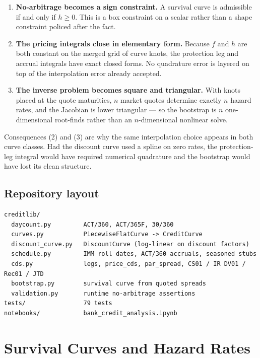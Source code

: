 \documentclass[11pt,a4paper]{article}
\newcommand{\keypoint}[1]{%
  \par\vspace{0.4em}\noindent
  \colorbox{codebg}{\parbox{\dimexpr\linewidth-2\fboxsep}{\small #1}}%
  \par\vspace{0.5em}}
\begin{document}
\begin{enumerate}[leftmargin=1.4em]
\item \textbf{No-arbitrage becomes a sign constraint.} A survival curve is admissible if
and only if $h \ge 0$. This is a box constraint on a scalar rather than a shape constraint
policed after the fact.
\item \textbf{The pricing integrals close in elementary form.} Because $f$ and $h$ are both
constant on the merged grid of curve knots, the protection leg and accrual integrals have
exact closed forms. No quadrature error is layered on top of the interpolation error
already accepted.
\item \textbf{The inverse problem becomes square and triangular.} With knots placed at the
quote maturities, $n$ market quotes determine exactly $n$ hazard rates, and the Jacobian is
lower triangular --- so the bootstrap is $n$ one-dimensional root-finds rather than an
$n$-dimensional nonlinear solve.
\end{enumerate}

\keypoint{Consequences (2) and (3) are why the same interpolation choice appears in both
curve classes. Had the discount curve used a spline on zero rates, the protection-leg
integral would have required numerical quadrature and the bootstrap would have lost its
clean structure.}

\subsection{Repository layout}

\begin{lstlisting}[language={}]
creditlib/
  daycount.py         ACT/360, ACT/365F, 30/360
  curves.py           PiecewiseFlatCurve -> CreditCurve
  discount_curve.py   DiscountCurve (log-linear on discount factors)
  schedule.py         IMM roll dates, ACT/360 accruals, seasoned stubs
  cds.py              legs, price_cds, par_spread, CS01 / IR DV01 / Rec01 / JTD
  bootstrap.py        survival curve from quoted spreads
  validation.py       runtime no-arbitrage assertions
tests/                79 tests
notebooks/            bank_credit_analysis.ipynb
\end{lstlisting}

\newpage
\section{Survival Curves and Hazard Rates}
\end{document}
